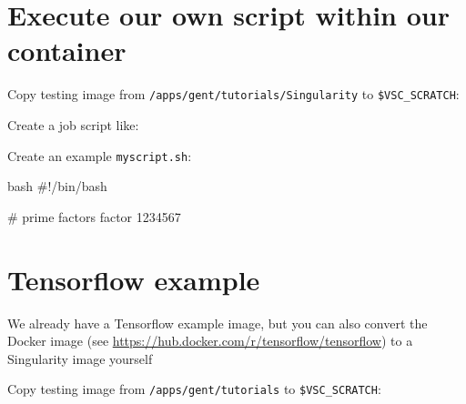\section{Execute our own script within our container}

Copy testing image from \lstinline|/apps/gent/tutorials/Singularity| to \lstinline|$VSC_SCRATCH|:

\begin{prompt}
\end{prompt}

Create a job script like:


Create an example \lstinline|myscript.sh|:

\begin{code}{bash}
#!/bin/bash

# prime factors
factor 1234567
\end{code}

\section{Tensorflow example}

We already have a Tensorflow example image, but you can also convert the Docker
image (see \url{https://hub.docker.com/r/tensorflow/tensorflow}) to a Singularity image yourself

Copy testing image from \lstinline|/apps/gent/tutorials| to \lstinline|$VSC_SCRATCH|:

\begin{prompt}
\end{prompt}



